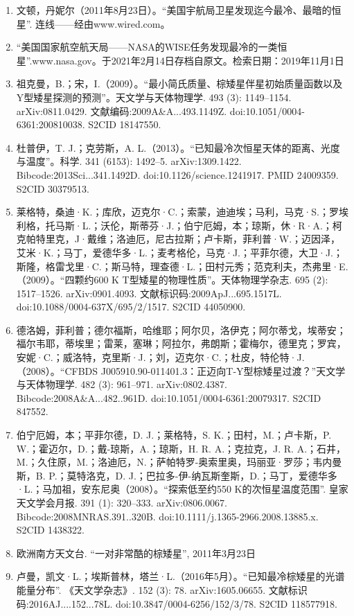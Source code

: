 \begin{enumerate}
\item 文顿，丹妮尔（2011年8月23日）。“美国宇航局卫星发现迄今最冷、最暗的恒星”. 连线——经由www.wired.com。
\item “美国国家航空航天局——NASA的WISE任务发现最冷的一类恒星”.www.nasa.gov。于2021年2月14日存档自原文。检索日期：2019年11月1日
\item 祖克曼，B.；宋，I.（2009）。“最小简氏质量、棕矮星伴星初始质量函数以及Y型矮星探测的预测”。天文学与天体物理学. 493 (3): 1149–1154. arXiv:0811.0429. 文献编码:2009A&A...493.1149Z. doi:10.1051/0004-6361:200810038. S2CID 18147550.
\item 杜普伊，T. J.；克劳斯，A. L.（2013）。“已知最冷次恒星天体的距离、光度与温度”。科学. 341 (6153): 1492–5. arXiv:1309.1422. Bibcode:2013Sci...341.1492D. doi:10.1126/science.1241917. PMID 24009359. S2CID 30379513.
\item 莱格特，桑迪·K.；库欣，迈克尔·C.；索蒙，迪迪埃；马利，马克·S.；罗埃利格，托马斯·L.；沃伦，斯蒂芬·J.；伯宁厄姆，本；琼斯，休·R·A.；柯克帕特里克，J·戴维；洛迪厄，尼古拉斯；卢卡斯，菲利普·W.；迈因泽，艾米·K.；马丁，爱德华多·L.；麦考格伦，马克·J.；平菲尔德，大卫·J.；斯隆，格雷戈里·C.；斯马特，理查德·L.；田村元秀；范克利夫，杰弗里·E.（2009）。“四颗约600 K T型矮星的物理性质”。天体物理学杂志. 695 (2): 1517–1526. arXiv:0901.4093. 文献标识码:2009ApJ...695.1517L. doi:10.1088/0004-637X/695/2/1517. S2CID 44050900.
\item 德洛姆，菲利普；德尔福斯，哈维耶；阿尔贝，洛伊克；阿尔蒂戈，埃蒂安；福尔韦耶，蒂埃里；雷莱，塞琳；阿拉尔，弗朗斯；霍梅尔，德里克；罗宾，安妮·C.；威洛特，克里斯·J.；刘，迈克尔·C.；杜皮，特伦特·J.（2008）。“CFBDS J005910.90-011401.3：正迈向T-Y型棕矮星过渡？”天文学与天体物理学. 482 (3): 961–971. arXiv:0802.4387. Bibcode:2008A&A...482..961D. doi:10.1051/0004-6361:20079317. S2CID 847552.
\item 伯宁厄姆，本；平菲尔德，D. J.；莱格特，S. K.；田村，M.；卢卡斯，P. W.；霍迈尔，D.；戴-琼斯，A.；琼斯，H. R. A.；克拉克，J. R. A.；石井，M.；久住原，M.；洛迪厄，N.；萨帕特罗-奥索里奥，玛丽亚·罗莎；韦内曼斯，B. P.；莫特洛克，D. J.；巴拉多-伊-纳瓦斯奎斯，D.；马丁，爱德华多·L.；马加祖，安东尼奥（2008）。“探索低至约550 K的次恒星温度范围”. 皇家天文学会月报. 391 (1): 320–333. arXiv:0806.0067. Bibcode:2008MNRAS.391..320B. doi:10.1111/j.1365-2966.2008.13885.x. S2CID 1438322.
\item 欧洲南方天文台. “一对非常酷的棕矮星”, 2011年3月23日
\item 卢曼，凯文·L.；埃斯普林，塔兰·L.（2016年5月）。“已知最冷棕矮星的光谱能量分布”. 《天文学杂志》. 152 (3): 78. arXiv:1605.06655. 文献标识码:2016AJ....152...78L. doi:10.3847/0004-6256/152/3/78. S2CID 118577918.

\end{enumerate}
